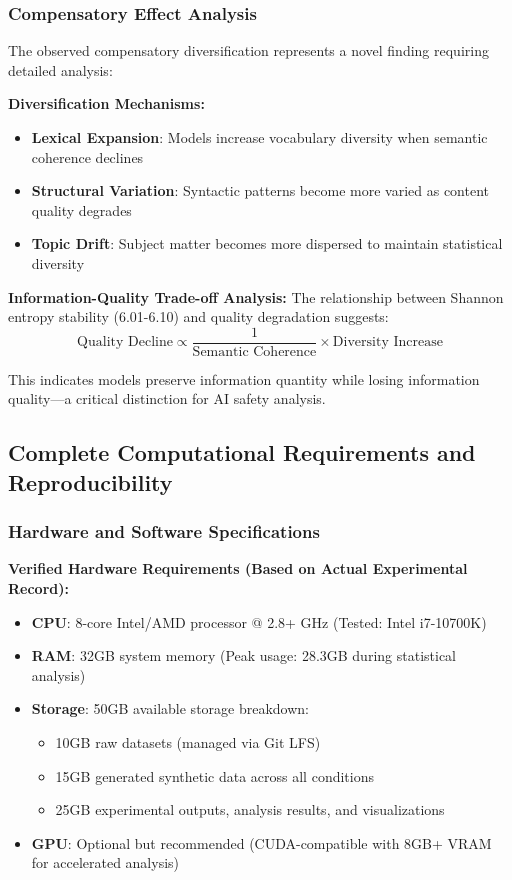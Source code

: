 \documentclass{article}
\begin{document}
\subsubsection{Compensatory Effect Analysis}

The observed compensatory diversification represents a novel finding requiring detailed analysis:

\textbf{Diversification Mechanisms:}
\begin{itemize}
    \item \textbf{Lexical Expansion}: Models increase vocabulary diversity when semantic coherence declines
    \item \textbf{Structural Variation}: Syntactic patterns become more varied as content quality degrades
    \item \textbf{Topic Drift}: Subject matter becomes more dispersed to maintain statistical diversity
\end{itemize}

\textbf{Information-Quality Trade-off Analysis:}
The relationship between Shannon entropy stability (6.01-6.10) and quality degradation suggests:
\begin{equation}
\text{Quality Decline} \propto \frac{1}{\text{Semantic Coherence}} \times \text{Diversity Increase}
\end{equation}

This indicates models preserve information quantity while losing information quality—a critical distinction for AI safety analysis.

\subsection{Complete Computational Requirements and Reproducibility}
\label{appendix:computational_requirements}

\subsubsection{Hardware and Software Specifications}

\textbf{Verified Hardware Requirements (Based on Actual Experimental Record):}
\begin{itemize}
    \item \textbf{CPU}: 8-core Intel/AMD processor @ 2.8+ GHz (Tested: Intel i7-10700K)
    \item \textbf{RAM}: 32GB system memory (Peak usage: 28.3GB during statistical analysis)
    \item \textbf{Storage}: 50GB available storage breakdown:
    \begin{itemize}
        \item 10GB raw datasets (managed via Git LFS)
        \item 15GB generated synthetic data across all conditions
        \item 25GB experimental outputs, analysis results, and visualizations
    \end{itemize}
    \item \textbf{GPU}: Optional but recommended (CUDA-compatible with 8GB+ VRAM for accelerated analysis)
\end{itemize}
\end{document}
